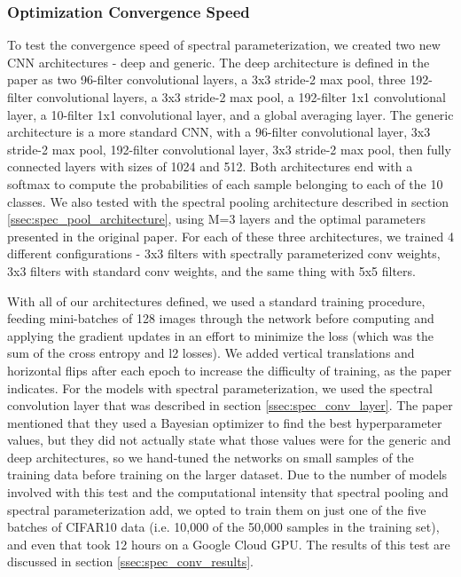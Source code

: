 \documentclass[10pt,journal,compsoc]{IEEEtran}
\begin{document}
\subsubsection{Optimization Convergence Speed}

To test the convergence speed of spectral parameterization, we created two new CNN architectures - deep and generic. The deep architecture is defined in the paper as two 96-filter convolutional layers, a 3x3 stride-2 max pool, three 192-filter convolutional layers, a 3x3 stride-2 max pool, a 192-filter 1x1 convolutional layer, a 10-filter 1x1 convolutional layer, and a global averaging layer. The generic architecture is a more standard CNN, with a 96-filter convolutional layer, 3x3 stride-2 max pool, 192-filter convolutional layer, 3x3 stride-2 max pool, then fully connected layers with sizes of 1024 and 512. Both architectures end with a softmax to compute the probabilities of each sample belonging to each of the 10 classes. We also tested with the spectral pooling architecture described in section \ref{ssec:spec_pool_architecture}, using M=3 layers and the optimal parameters presented in the original paper. For each of these three architectures, we trained 4 different configurations - 3x3 filters with spectrally parameterized conv weights, 3x3 filters with standard conv weights, and the same thing with 5x5 filters.

With all of our architectures defined, we used a standard training procedure, feeding mini-batches of 128 images through the network before computing and applying the gradient updates in an effort to minimize the loss (which was the sum of the cross entropy and l2 losses). We added vertical translations and horizontal flips after each epoch to increase the difficulty of training, as the paper indicates. For the models with spectral parameterization, we used the spectral convolution layer that was described in section \ref{ssec:spec_conv_layer}. The paper mentioned that they used a Bayesian optimizer to find the best hyperparameter values, but they did not actually state what those values were for the generic and deep architectures, so we hand-tuned the networks on small samples of the training data before training on the larger dataset. Due to the number of models involved with this test and the computational intensity that spectral pooling and spectral parameterization add, we opted to train them on just one of the five batches of CIFAR10 data (i.e. 10,000 of the 50,000 samples in the training set), and even that took 12 hours on a Google Cloud GPU. The results of this test are discussed in section \ref{ssec:spec_conv_results}.
\end{document}
